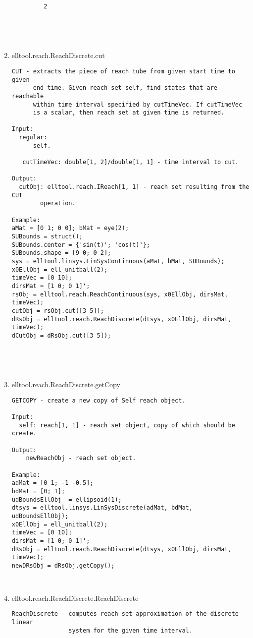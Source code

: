 \begin{enumerate}
\begin{lstlisting}
         2





\end{lstlisting}
\fontfamily{\familydefault}
\selectfont
\item {elltool.reach.ReachDiscrete.cut}
\selectfont
\begin{lstlisting}
CUT - extracts the piece of reach tube from given start time to given
      end time. Given reach set self, find states that are reachable
      within time interval specified by cutTimeVec. If cutTimeVec
      is a scalar, then reach set at given time is returned.

Input:
  regular:
      self.

   cutTimeVec: double[1, 2]/double[1, 1] - time interval to cut.

Output:
  cutObj: elltool.reach.IReach[1, 1] - reach set resulting from the CUT
        operation.

Example:
aMat = [0 1; 0 0]; bMat = eye(2);
SUBounds = struct();
SUBounds.center = {'sin(t)'; 'cos(t)'};
SUBounds.shape = [9 0; 0 2];
sys = elltool.linsys.LinSysContinuous(aMat, bMat, SUBounds);
x0EllObj = ell_unitball(2);
timeVec = [0 10];
dirsMat = [1 0; 0 1]';
rsObj = elltool.reach.ReachContinuous(sys, x0EllObj, dirsMat, timeVec);
cutObj = rsObj.cut([3 5]);
dRsObj = elltool.reach.ReachDiscrete(dtsys, x0EllObj, dirsMat, timeVec);
dCutObj = dRsObj.cut([3 5]);





\end{lstlisting}
\fontfamily{\familydefault}
\selectfont
\item {elltool.reach.ReachDiscrete.getCopy}
\selectfont
\begin{lstlisting}
GETCOPY - create a new copy of Self reach object.

Input:
  self: reach[1, 1] - reach set object, copy of which should be create.

Output:
    newReachObj - reach set object.

Example:
adMat = [0 1; -1 -0.5];
bdMat = [0; 1];
udBoundsEllObj  = ellipsoid(1);
dtsys = elltool.linsys.LinSysDiscrete(adMat, bdMat, udBoundsEllObj);
x0EllObj = ell_unitball(2);
timeVec = [0 10];
dirsMat = [1 0; 0 1]';
dRsObj = elltool.reach.ReachDiscrete(dtsys, x0EllObj, dirsMat, timeVec);
newDRsObj = dRsObj.getCopy();



\end{lstlisting}
\fontfamily{\familydefault}
\selectfont
\item {elltool.reach.ReachDiscrete.ReachDiscrete}
\selectfont
\begin{lstlisting}
ReachDiscrete - computes reach set approximation of the discrete linear
                system for the given time interval.



\end{lstlisting}
\end{enumerate}
